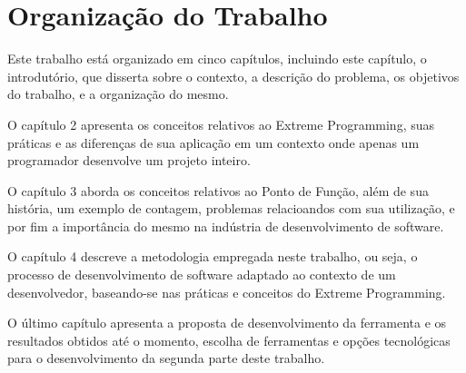\section{Organização do Trabalho}

Este trabalho está organizado em cinco capítulos, incluindo este capítulo, o
introdutório, que disserta sobre o contexto, a descrição do problema, os
objetivos do trabalho, e a organização do mesmo.

O capítulo 2 apresenta os conceitos relativos ao Extreme Programming, suas
práticas e as diferenças de sua aplicação em um contexto onde apenas um
programador desenvolve um projeto inteiro.

O capítulo 3 aborda os conceitos relativos ao Ponto de Função, além de sua história, um exemplo de contagem, problemas relacioandos com sua utilização, e por fim  a importância do mesmo na indústria de desenvolvimento de software.

O capítulo 4 descreve a metodologia empregada neste trabalho, ou seja,
o processo de desenvolvimento de software adaptado ao contexto de um
desenvolvedor, baseando-se nas práticas e conceitos do Extreme Programming.

O último capítulo apresenta a proposta de desenvolvimento da ferramenta e os resultados obtidos até o momento, escolha de ferramentas e opções tecnológicas para o desenvolvimento da segunda parte deste trabalho.
